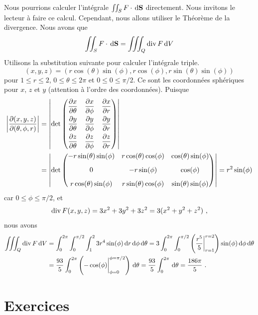 {\begin{egg}
Nous pourrions calculer l'intégrale $\iint_S F \cdot \,\mathrm{d}\mathbf{S}$
directement.  Nous invitons le lecteur à faire ce calcul.  Cependant, nous
allons utiliser le Théorème de la divergence.  Nous avons que
\[
\iint_S F \cdot \,\mathrm{d}\mathbf{S} = \iiint_Q \operatorname{div}  F \,\mathrm{d}V
\]
Utilisons la substitution suivante pour calculer l'intégrale triple.
\[
(x,y,z) = (r \cos(\theta)\sin(\phi), r \cos(\phi), r\sin(\theta) \sin(\phi))
\]
pour $1 \leq r \leq 2$, $0 \leq \theta \leq 2\pi$ et
$0 \leq 0 \leq \pi/2$.  Ce sont les coordonnées sphériques pour $x$,
$z$ et $y$ (attention à l'ordre des coordonnées).  Puisque
\begin{align*}
\left| \frac{\partial(x,y,z)}{\partial(\theta,\phi,r)} \right| &=  
\left| \det \begin{pmatrix}
  \displaystyle \frac{\partial x}{\partial \theta} & \displaystyle \frac{\partial x}{\partial \phi}
  & \displaystyle \frac{\partial x}{\partial r} \\[0.8em]
  \displaystyle \frac{\partial y}{\partial \theta} & \displaystyle \frac{\partial y}{\partial \phi}
  & \displaystyle \frac{\partial y}{\partial r} \\[0.8em]
  \displaystyle \frac{\partial z}{\partial \theta} & \displaystyle \frac{\partial z}{\partial \phi}
  & \displaystyle \frac{\partial z}{\partial r}
\end{pmatrix} \right| \\
&= 
\left| \det \begin{pmatrix}
  -r\sin(\theta) \sin(\phi) & r\cos(\theta)\cos(\phi)
  & \cos(\theta)\sin(\phi) \\[0.8em]
  0 & -r\sin(\phi) & \cos(\phi) \\[0.8em]
  r\cos(\theta) \sin(\phi) & r\sin(\theta)\cos(\phi)
  & \sin(\theta)\sin(\phi) \end{pmatrix} \right|
= r^2 \sin(\phi)
\end{align*}
car $0 \leq \phi \leq \pi/2$, et
\[
  \operatorname{div} F(x,y,z) = 3 x^2 + 3 y^2 + 3 z^2 = 3(x^2 + y^2 + z^2) \ ,
\]
nous avons
\begin{align*}
\iiint_Q \operatorname{div}  F \,\mathrm{d}V &=
\int_0^{2\pi} \int_0^{\pi/2} \int_1^2 3 r^4 \sin(\phi) \,\mathrm{d}r
\,\mathrm{d}\phi\,\mathrm{d}\theta
= 3 \int_0^{2\pi} \int_0^{\pi/2} \left(\frac{r^5}{5}\bigg|_{r=1}^{r=2}\right)
\sin(\phi) \,\mathrm{d}\phi\,\mathrm{d}\theta \\
&= \frac{93}{5} \int_0^{2\pi} \left(-\cos(\phi)\bigg|_{\phi=0}^{\phi=\pi/2}\right)
\,\mathrm{d}\theta
= \frac{93}{5} \int_0^{2\pi} \,\mathrm{d}\theta
= \frac{186\pi}{5} \ .
\end{align*}
\end{egg}

}  %

\section{Exercices}

